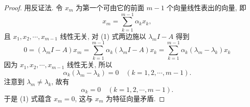 \documentclass[lang=cn,newtx,10pt,scheme=chinese,thmcnt=chapter]{elegantbook}
\begin{document}
\begin{proof}
 用反证法. 令 $x_m$ 为第一个可由它的前面 $m-1$ 个向量线性表出的向量, 即
\begin{equation*}
x_m=\sum_{k=1}^{m-1} \alpha_k x_k,
\end{equation*}
且 $x_1, x_2, \cdots, x_{m-1}$ 线性无关, 对 (1) 式两边施以 $\lambda_m I-A$ 得到
\begin{equation*}
0=\left(\lambda_m I-A\right) x_m=\sum_{k=1}^{m-1} \alpha_k\left(\lambda_m I-A\right) x_k=\sum_{k=1}^{m-1} \alpha_k\left(\lambda_m-\lambda_k\right) x_k
\end{equation*}
因为 $x_1, x_2, \cdots, x_{m-1}$ 线性无关, 所以
\begin{equation*}
\alpha_k\left(\lambda_m-\lambda_k\right)=0 \quad(k=1,2, \cdots, m-1) .
\end{equation*}
注意到 $\lambda_m \neq \lambda_k$, 故有
\begin{equation*}
\alpha_k=0 \quad(k=1,2, \cdots, m-1) .
\end{equation*}
于是 (1) 式蕴含 $x_m=0$, 这与 $x_m$ 为特征向量矛盾.
\end{proof}
\end{document}
